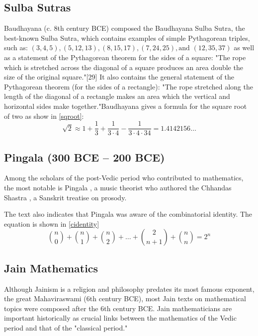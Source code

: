\documentclass[12pt,a4paper]{article}
\begin{document}
\subsection{Sulba Sutras}

Baudhayana (c. 8th century BCE) composed the Baudhayana Sulba Sutra, the best-known Sulba Sutra, which contains examples of simple Pythagorean triples, such as: $(3, 4, 5), (5, 12, 13), (8, 15, 17), (7, 24, 25),\text{and }  (12, 35, 37)$ as well as a statement of the Pythagorean theorem for the sides of a square: "The rope which is stretched across the diagonal of a square produces an area double the size of the original square."[29] It also contains the general statement of the Pythagorean theorem (for the sides of a rectangle): "The rope stretched along the length of the diagonal of a rectangle makes an area which the vertical and horizontal sides make together."Baudhayana gives a formula for the square root of two as show in \eqref{sqroot}:
\begin{equation}
\sqrt{2} \approx 1+ \frac{1}{3} + \frac{1}{ 3 \cdot 4} - \frac{1}{3 \cdot 4 \cdot 34} = 1.4142156\dots
\label{sqroot}
\end{equation}

\subsection{Pingala (300 BCE – 200 BCE)}
Among the scholars of the post-Vedic period who contributed to mathematics, the most notable is Pingala , a music theorist who authored the Chhandas Shastra , a Sanskrit treatise on prosody.  

The text also indicates that Pingala was aware of the combinatorial identity. The equation is shown in \eqref{cidentity}\\

\begin{equation}
\binom{n}{0} + \binom{n}{1} +\binom{n}{2} +\dots  +\binom{2}{n+1} + \binom{n}{n} = 2^n
\label{cidentity}
\end{equation}


\subsection{Jain Mathematics}
Although Jainism is a religion and philosophy predates its most famous exponent, the great Mahaviraswami (6th century BCE), most Jain texts on mathematical topics were composed after the 6th century BCE. Jain mathematicians are important historically as crucial links between the mathematics of the Vedic period and that of the "classical period."
\end{document}
